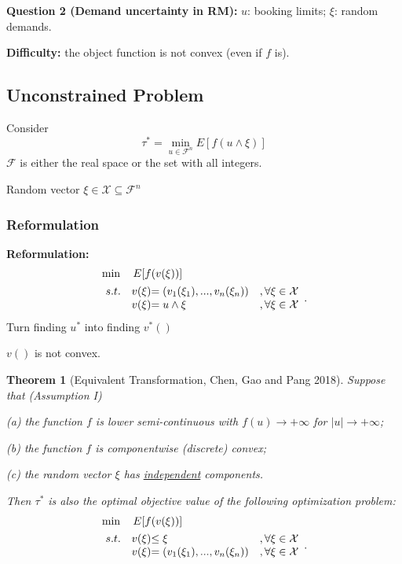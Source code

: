 \documentclass[11pt,a4paper]{article}
\newtheorem{theorem}{Theorem}
\begin{document}
\textbf{Question 2 (Demand uncertainty in RM):} $u$: booking limits; $\xi$: random demands.

\textbf{Difficulty:} the object function is not convex (even if $f$ is).

\subsection{Unconstrained Problem}
Consider $$\tau^*=\min_{u\in \mathcal{F}^n} E[f(u\wedge \xi)]$$
$\mathcal{F}$ is either the real space or the set with all integers.

Random vector $\xi\in \mathcal{X}\subseteq \mathcal{F}^n$

\subsubsection{Reformulation}
\textbf{Reformulation:}
\begin{align*}
        &\min\quad E[f(v(\xi))]\\
        &\begin{array}{r@{\quad}r@{}l@{\quad}l}
        s.t.
        &v(\xi)&=(v_1(\xi_1),...,v_n(\xi_n))&, \forall \xi\in \mathcal{X} \\
        &v(\xi)&=u\wedge \xi&,\forall \xi\in \mathcal{X}\\
    \end{array} .
\end{align*}
Turn finding $u^*$ into finding $v^*()$

$v()$ is not convex.

\begin{theorem}[Equivalent Transformation, Chen, Gao and Pang 2018]
    Suppose that (Assumption I)

    (a) the function $f$ is lower semi-continuous with $f(u) \rightarrow+\infty$ for $|u| \rightarrow+\infty$;

    (b) the function $f$ is componentwise (discrete) convex;

    (c) the random vector $\xi$ has \underline{independent} components.

    Then $\tau^{*}$ is also the optimal objective value of the following optimization problem:
\begin{align*}
        &\min\quad E[f(v(\xi))]\\
        &\begin{array}{r@{\quad}r@{}l@{\quad}l}
        s.t.
        &v(\xi)&\leq \xi&,\forall \xi\in \mathcal{X}\\
        &v(\xi)&=(v_1(\xi_1),...,v_n(\xi_n))&, \forall \xi\in \mathcal{X} \\
    \end{array} .
\end{align*}
\end{theorem}
\end{document}
